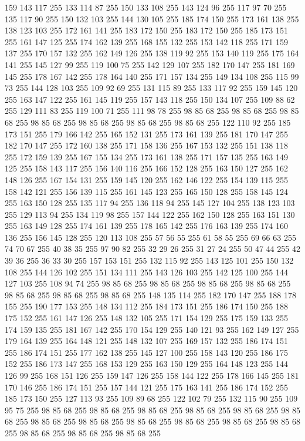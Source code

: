 159 143 117 255 133 114 87 255 150 133 108 255 143 124 96 255 117 97 70 255 135 117 90 255 150 132 103 255 144 130 105 255 185 174 150 255 173 161 138 255 138 123 103 255 172 161 141 255 183 172 150 255 183 172 150 255 185 173 151 255 161 147 125 255 174 162 139 255 168 155 132 255 153 142 118 255 171 159 137 255 170 157 132 255 162 149 126 255 138 119 92 255 153 140 119 255 175 164 141 255 145 127 99 255 119 100 75 255 142 129 107 255 182 170 147 255 181 169 145 255 178 167 142 255 178 164 140 255 171 157 134 255 149 134 108 255 115 99 73 255 144 128 103 255 109 92 69 255 131 115 89 255 133 117 92 255 159 145 120 255 163 147 122 255 161 145 119 255 157 143 118 255 150 134 107 255 109 88 62 255 129 111 83 255 119 100 71 255 111 98 78 255 98 85 68 255 98 85 68 255 98 85 68 255 98 85 68 255 98 85 68 255 98 85 68 255 98 85 68 255 122 110 92 255 185 173 151 255 179 166 142 255 165 152 131 255 173 161 139 255 181 170 147 255 182 170 147 255 172 160 138 255 171 158 136 255
167 153 132 255 151 138 118 255 172 159 139 255 167 155 134 255 173 161 138 255 171 157 135 255 163 149 125 255 158 143 117 255 156 140 116 255 166 152 128 255 163 150 127 255 162 148 126 255 167 154 131 255 159 145 120 255 162 146 122 255 154 139 115 255 158 142 121 255 156 139 115 255 161 145 123 255 165 150 128 255 158 145 124 255 163 150 128 255 135 117 94 255 136 118 94 255 145 127 104 255 138 123 103 255 129 113 94 255 134 119 98 255 157 144 122 255 162 150 128 255 163 151 130 255 163 149 128 255 174 161 139 255 178 165 142 255 176 163 139 255 174 160 136 255 156 145 128 255 120 113 108 255 57 56 55 255 61 58 55 255 69 66 63 255 74 70 67 255 40 38 35 255 97 90 82 255 32 29 26 255 31 27 24 255 50 47 44 255 42 39 36 255 36 33 30 255 157 153 151 255 132 115 92 255 143 125 101 255 150 132 108 255 144 126 102 255 151 134 111 255 143 126 103 255 142 125 100 255 144 127 103 255 108 94 74 255 98 85 68 255 98 85 68 255 98 85 68 255 98 85 68 255 98 85 68 255
98 85 68 255 98 85 68 255 148 135 114 255 182 170 147 255 188 178 155 255 190 177 153 255 148 134 112 255 184 173 151 255 186 174 150 255 188 175 152 255 161 147 126 255 148 132 105 255 171 154 129 255 175 159 133 255 174 159 135 255 181 167 142 255 170 154 129 255 140 121 93 255 162 149 127 255 179 164 139 255 164 148 121 255 148 132 107 255 169 157 132 255 186 174 151 255 186 174 151 255 177 162 138 255 145 127 100 255 158 143 120 255 186 175 152 255 186 173 147 255 168 153 129 255 163 150 129 255 164 148 123 255 144 126 99 255 168 151 126 255 159 147 126 255 158 144 122 255 178 166 145 255 181 170 146 255 186 174 151 255 157 144 121 255 175 163 141 255 186 174 152 255 185 173 150 255 127 113 93 255 109 89 68 255 122 102 79 255 132 115 90 255 109 95 75 255 98 85 68 255 98 85 68 255 98 85 68 255 98 85 68 255 98 85 68 255 98 85 68 255 98 85 68 255 98 85 68 255 98 85 68 255 98 85 68 255 98 85 68 255 98 85 68 255 98 85 68 255 98 85 68 255 98 85 68 255
